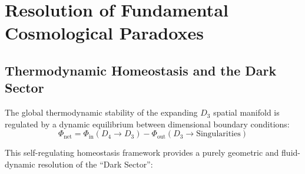 \documentclass[twocolumn]{aa}
\begin{document}
\section{Resolution of Fundamental Cosmological Paradoxes}

\subsection{Thermodynamic Homeostasis and the Dark Sector}
The global thermodynamic stability of the expanding $D_3$ spatial manifold is regulated by a dynamic equilibrium between dimensional boundary conditions:
\begin{equation}
\Phi_{\text{net}} = \Phi_{\text{in}}(D_4 \rightarrow D_3) - \Phi_{\text{out}}(D_3 \rightarrow \text{Singularities})
\end{equation}

This self-regulating homeostasis framework provides a purely geometric and fluid-dynamic resolution of the ``Dark Sector'':
\end{document}
